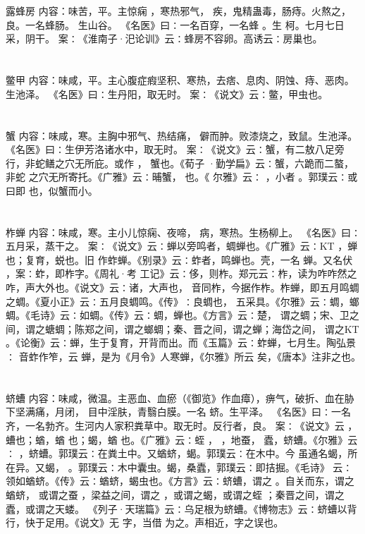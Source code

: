 \documentclass[12pt,UTF8]{ctexbook}
\begin{document}
\chapter{}露蜂房
内容：味苦，平。主惊痫 ，寒热邪气， 疾，鬼精蛊毒，肠痔。火熬之，良。一名蜂肠。 
生山谷。 
《名医》曰∶一名百穿，一名蜂 。生 柯。七月七日采，阴干。 
案∶《淮南子·汜论训》云∶蜂房不容卵。高诱云∶房巢也。 


\chapter{}鳖甲
内容：味咸，平。主心腹症瘕坚积、寒热，去痞、息肉、阴蚀、痔、恶肉。生池泽。 
《名医》曰∶生丹阳，取无时。 
案∶《说文》云∶鳖，甲虫也。 


\chapter{}蟹
内容：味咸，寒。主胸中邪气、热结痛， 僻而肿。败漆烧之，致鼠。生池泽。 
《名医》曰∶生伊芳洛诸水中，取无时。 
案∶《说文》云∶蟹，有二敖八足旁行，非蛇鳝之穴无所庇。或作 ， 蟹也。《荀子 
·勤学扁》云∶蟹，六跪而二螯，非蛇 之穴无所寄托。《广雅》云∶晡蟹， 也。《 
尔雅》云∶ ，小者 。郭璞云∶或曰即 也，似蟹而小。 


\chapter{}柞蝉
内容：味咸，寒。主小儿惊痫、夜啼， 病，寒热。生杨柳上。 
《名医》曰∶五月采，蒸干之。 
案∶《说文》云∶蝉以旁鸣者，蜩蝉也。《广雅》云∶KT ，蝉也；复育，蜕也。旧 
作蚱蝉。《别录》云∶蚱者，鸣蝉也。壳，一名 蝉。又名伏 ，案∶蚱，即柞字。《周礼·考 
工记》云∶侈，则柞。郑元云∶柞，读为咋咋然之咋，声大外也。《说文》云∶诸，大声也， 
音同柞，今据作柞。柞蝉，即五月鸣蜩之蜩。《夏小正》云∶五月良蜩鸣。《传》∶良蜩也， 
五采具。《尔雅》云∶蜩，螂蜩。《毛诗》云∶如蜩。《传》云∶蜩，蝉也。《方言》云∶楚， 
谓之蜩；宋、卫之间，谓之螗蜩；陈郑之间，谓之螂蜩；秦、晋之间，谓之蝉；海岱之间， 
谓之KT 。《论衡》云∶蝉，生于复育，开背而出。而《玉篇》云∶蚱蝉，七月生。陶弘景∶ 
音蚱作笮，云 蝉，是为《月令》人寒蝉，《尔雅》所云 矣，《唐本》注非之也。 


\chapter{}蛴螬
内容：味咸，微温。主恶血、血瘀（《御览》作血瘴），痹气，破折、血在胁下坚满痛，月闭， 
目中淫肤，青翳白膜。一名 蛴。生平泽。 
《名医》曰∶一名 齐，一名勃齐。生河内人家积粪草中。取无时。反行者，良。 
案∶《说文》云 ， 螬也；蝤，蝤 也；蝎，蝤 也。《广雅》云∶蛭 ， ，地蚕， 
蠹，蛴螬。《尔雅》云∶ ，蛴螬。郭璞云∶在粪土中。又蝤蛴，蝎。郭璞云∶在木中。今 
虽通名蝎，所在异。又蝎， 。郭璞云∶木中囊虫。蝎，桑蠹，郭璞云∶即拮掘。《毛诗》 
云∶领如蝤蛴。《传》云∶蝤蛴，蝎虫也。《方言》云∶蛴螬，谓之 。自关而东，谓之蝤蛴， 
或谓之蚕 ，梁益之间，谓之 ，或谓之蝎，或谓之蛭 ；秦晋之间，谓之蠹，或谓之天蝼。 
《列子·天瑞篇》云∶乌足根为蛴螬。《博物志》云∶蛴螬以背行，快于足用。《说文》无 
字，当借 为之。声相近，字之误也。 
\end{document}
